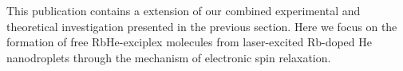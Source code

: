 	This publication contains a extension of our combined experimental and theoretical investigation presented in the previous section. Here we focus on the formation of free RbHe-exciplex molecules from laser-excited Rb-doped He nanodroplets through the mechanism of electronic spin relaxation.%
	
	\cleardoublepage
	